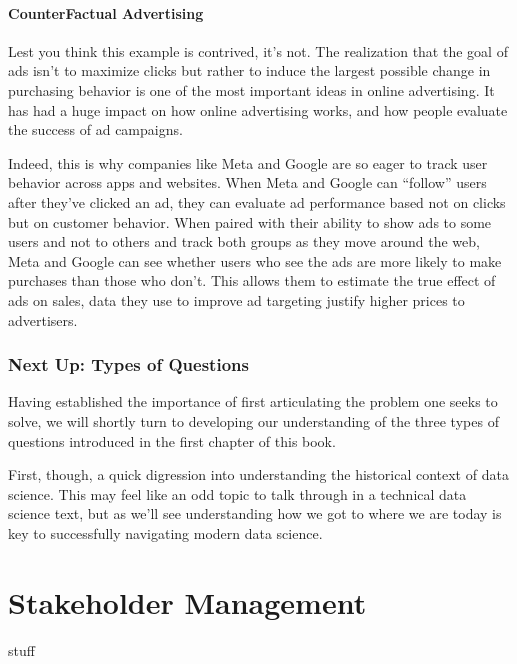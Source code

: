 \documentclass[letterpaper,10pt,english]{jupyterBook}
\begin{document}
\subsubsection{Counter\sphinxhyphen{}Factual Advertising}
\label{\detokenize{20_problems_to_questions/15_solving_the_wrong_problem:counter-factual-advertising}}
\sphinxAtStartPar
Lest you think this example is contrived, it’s not. The realization that the goal of ads isn’t to maximize clicks but rather to induce the largest possible change in purchasing behavior is one of the most important ideas in online advertising. It has had a huge impact on how online advertising works, and how people evaluate the success of ad campaigns.

\sphinxAtStartPar
Indeed, this is why companies like Meta and Google are so eager to track user behavior across apps and websites. When Meta and Google can “follow” users after they’ve clicked an ad, they can evaluate ad performance based not on clicks but on customer behavior. When paired with their ability to show ads to some users and not to others and track both groups as they move around the web, Meta and Google can see whether users who see the ads are more likely to make purchases than those who don’t. This allows them to estimate the true effect of ads on sales, data they use to improve ad targeting  justify higher prices to advertisers.


\subsection{Next Up: Types of Questions}
\label{\detokenize{20_problems_to_questions/15_solving_the_wrong_problem:next-up-types-of-questions}}
\sphinxAtStartPar
Having established the importance of first articulating the problem one seeks to solve, we will shortly turn to developing our understanding of the three types of questions introduced in the first chapter of this book.

\sphinxAtStartPar
First, though, a quick digression into understanding the historical context of data science. This may feel like an odd topic to talk through in a technical data science text, but as we’ll see understanding how we got to where we are today is key to successfully navigating modern data science.

\sphinxstepscope


\chapter{Stakeholder Management}
\label{\detokenize{20_problems_to_questions/20_stakeholder_management:stakeholder-management}}\label{\detokenize{20_problems_to_questions/20_stakeholder_management::doc}}
\sphinxAtStartPar
stuff
\end{document}
